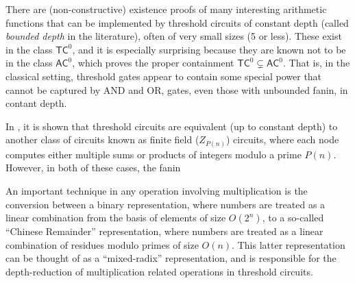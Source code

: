 There are (non-constructive) existence proofs of many interesting 
arithmetic functions that can be implemented by threshold circuits
of constant depth (called \emph{bounded depth} in the literature),
often of very small sizes (5 or less). These exist in the class
$\textsf{TC}^0$, and it is especially surprising because they are known
not to be in the class $\textsf{AC}^0$, which proves the proper
containment $\textsf{TC}^0 \subsetneq \textsf{AC}^0$. That is, in
the classical setting, threshold gates appear to contain some
special power that cannot be captured by AND and OR, gates, even those
with unbounded fanin, in contant depth.

In \cite{Reif1992}, it is shown that threshold circuits
are equivalent (up to constant depth) to another class of
circuits known as finite field ($Z_{P(n)}$) circuits, where each node
computes either multiple sums or products of integers modulo a
prime $P(n)$. However, in both of these cases, the fanin

An important technique in any operation involving multiplication is
the conversion between a binary representation, where numbers are
treated as a linear combination from the basis of elements of
size $O(2^n)$, to a so-called ``Chinese Remainder'' representation,
where numbers are treated as a linear combination of residues
modulo primes of size $O(n)$. This latter representation can be thought
of as a ``mixed-radix'' representation, and is responsible for
the depth-reduction of multiplication related operations in
threshold circuits.